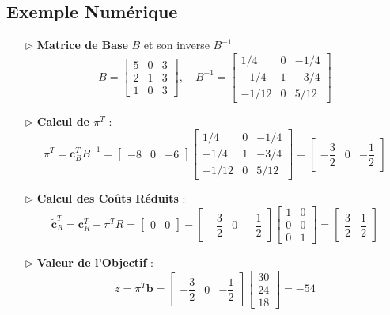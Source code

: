 \documentclass{report}
\begin{document}
\begin{multicols*}{2}
\subsection*{Exemple Numérique}

\begin{itemize}
    \item[$\rhd$] \textbf{Matrice de Base} \( B \) et son inverse \( B^{-1} \)
    \[
    B = 
    \begin{bmatrix}
    5 & 0 & 3 \\
    2 & 1 & 3 \\
    1 & 0 & 3
    \end{bmatrix}, \quad
    B^{-1} = 
    \begin{bmatrix}
    1/4 & 0 & -1/4 \\
    -1/4 & 1 & -3/4 \\
    -1/12 & 0 & 5/12
    \end{bmatrix}
    \]
    \item[$\rhd$] \textbf{Calcul de \( \pi^T \)} :
    \[
    \pi^T = \mathbf{c}_B^T B^{-1} = 
    \begin{bmatrix}
    -8 & 0 & -6
    \end{bmatrix}
    \begin{bmatrix}
    1/4 & 0 & -1/4 \\
    -1/4 & 1 & -3/4 \\
    -1/12 & 0 & 5/12
    \end{bmatrix} = 
    \begin{bmatrix}
    -\dfrac{3}{2} & 0 & -\dfrac{1}{2}
    \end{bmatrix}
    \]
    \item[$\rhd$] \textbf{Calcul des Coûts Réduits} :
    \[
    \tilde{\mathbf{c}}_R^T = \mathbf{c}_R^T - \pi^T R = 
    \begin{bmatrix}
    0 & 0
    \end{bmatrix} - 
    \begin{bmatrix}
    -\dfrac{3}{2} & 0 & -\dfrac{1}{2}
    \end{bmatrix}
    \begin{bmatrix}
    1 & 0 \\
    0 & 0 \\
    0 & 1
    \end{bmatrix} = 
    \begin{bmatrix}
    \dfrac{3}{2} & \dfrac{1}{2}
    \end{bmatrix}
    \]
    \item[$\rhd$] \textbf{Valeur de l'Objectif} :
    \[
    z = \pi^T \mathbf{b} = 
    \begin{bmatrix}
    -\dfrac{3}{2} & 0 & -\dfrac{1}{2}
    \end{bmatrix}
    \begin{bmatrix}
    30 \\ 24 \\ 18
    \end{bmatrix} = -54
    \]
\end{itemize}


\end{multicols*}
\end{document}
